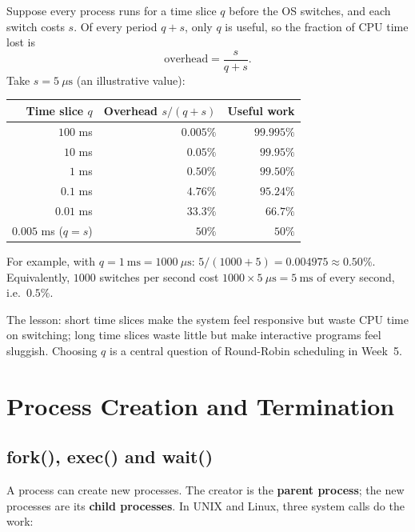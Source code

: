 \documentclass[11pt,a4paper]{article}
\newcommand{\term}[1]{\textbf{\color{mintdeep}#1}}
\begin{document}
\begin{example}
Suppose every process runs for a time slice $q$ before the OS switches, and each switch costs $s$. Of every period $q + s$, only $q$ is useful, so the fraction of CPU time lost is
\[
\text{overhead} = \frac{s}{q + s}.
\]
Take $s = 5\ \mu\text{s}$ (an illustrative value):
\begin{center}
\renewcommand{\arraystretch}{1.25}
\begin{tabular}{@{}rrr@{}}
\toprule
\textbf{Time slice $q$} & \textbf{Overhead $s/(q+s)$} & \textbf{Useful work} \\
\midrule
$100$ ms & $0.005\%$ & $99.995\%$ \\
$10$ ms & $0.05\%$ & $99.95\%$ \\
$1$ ms & $0.50\%$ & $99.50\%$ \\
$0.1$ ms & $4.76\%$ & $95.24\%$ \\
$0.01$ ms & $33.3\%$ & $66.7\%$ \\
$0.005$ ms ($q = s$) & $50\%$ & $50\%$ \\
\bottomrule
\end{tabular}
\end{center}
For example, with $q = 1\ \text{ms} = 1000\ \mu\text{s}$: $5/(1000+5) = 0.004975 \approx 0.50\%$. Equivalently, $1000$ switches per second cost $1000 \times 5\ \mu\text{s} = 5\ \text{ms}$ of every second, i.e.\ $0.5\%$.

The lesson: short time slices make the system feel responsive but waste CPU time on switching; long time slices waste little but make interactive programs feel sluggish. Choosing $q$ is a central question of Round-Robin scheduling in Week~5.
\end{example}

\section{Process Creation and Termination}
\label{sec:creation}

\subsection{fork(), exec() and wait()}

A process can create new processes. The creator is the \term{parent process}; the new processes are its \term{child processes}. In UNIX and Linux, three system calls do the work:
\end{document}
